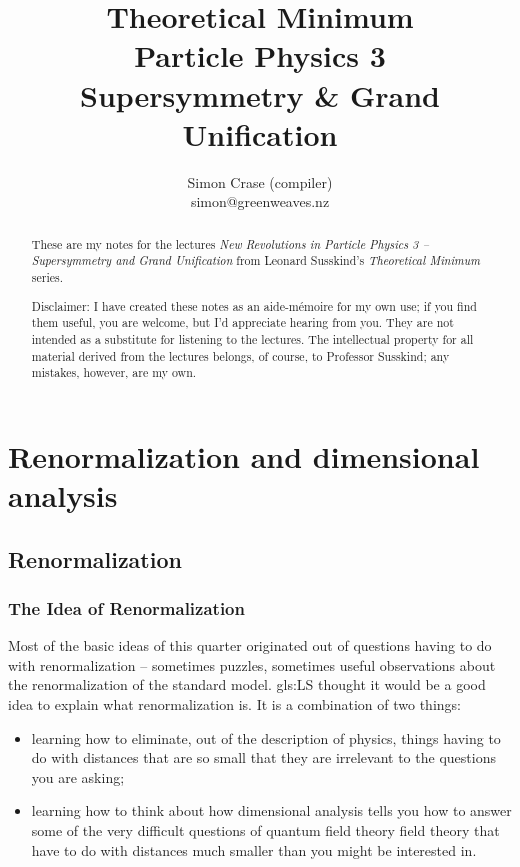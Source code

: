 \documentclass[]{article}
\title{Theoretical Minimum\\Particle Physics 3\\Supersymmetry \& Grand Unification}
\author{Simon Crase (compiler)\\simon@greenweaves.nz}
\begin{document}
\maketitle

\begin{abstract}
	These are my notes for the lectures \emph{New Revolutions in Particle Physics 3 -- Supersymmetry and Grand Unification} from Leonard Susskind's \emph{Theoretical Minimum} series\cite{susskind2007theoretical}. 
	
	Disclaimer: I have created these notes as an aide-m\'emoire for my own use; if you find them useful, you are welcome, but I'd appreciate hearing from you. They are not intended as a substitute for listening to the lectures. The intellectual property for all material derived from the lectures belongs, of course, to Professor Susskind; any mistakes, however, are my own.
	
\end{abstract}

\tableofcontents
\listoffigures
\listoftables
\listoftheorems

\section{Renormalization  and dimensional analysis}\label{sect:renormalization}

\subsection{Renormalization}

\subsubsection{The Idea of Renormalization}

Most of the basic ideas of this quarter originated out of questions having to do with renormalization -- sometimes puzzles, sometimes useful observations about the renormalization of the standard model. \gls{gls:LS} thought it would be a good idea to explain what renormalization is. It  is a combination of two things:
\begin{itemize}
	\item learning how to eliminate, out of the description of physics, things having to do with distances that are so small that they are irrelevant to the questions you are asking;
	\item learning how to think about how dimensional analysis tells you how to answer some of the very difficult questions of quantum field theory field theory that have to do with distances much smaller than you might be interested in.
\end{itemize}
\end{document}
